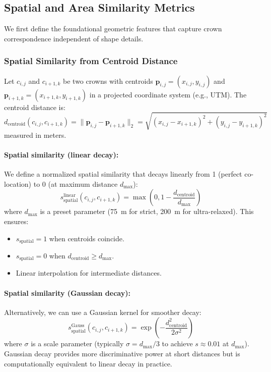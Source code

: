 \subsection{Spatial and Area Similarity Metrics}

We first define the foundational geometric features that capture crown correspondence independent of shape details.

\subsubsection{Spatial Similarity from Centroid Distance}

Let $c_{i,j}$ and $c_{i+1,k}$ be two crowns with centroids $\mathbf{p}_{i,j} = (x_{i,j}, y_{i,j})$ and $\mathbf{p}_{i+1,k} = (x_{i+1,k}, y_{i+1,k})$ in a projected coordinate system (e.g., UTM). The centroid distance is:
\[
d_{\text{centroid}}(c_{i,j}, c_{i+1,k}) = \|\mathbf{p}_{i,j} - \mathbf{p}_{i+1,k}\|_2 = \sqrt{(x_{i,j} - x_{i+1,k})^2 + (y_{i,j} - y_{i+1,k})^2}
\]
measured in meters.

\paragraph{Spatial similarity (linear decay):}
We define a normalized spatial similarity that decays linearly from 1 (perfect co-location) to 0 (at maximum distance $d_{\max}$):
\[
s_{\text{spatial}}^{\text{linear}}(c_{i,j}, c_{i+1,k}) = \max\left(0, 1 - \frac{d_{\text{centroid}}}{d_{\max}}\right)
\]
where $d_{\max}$ is a preset parameter (75~m for strict, 200~m for ultra-relaxed). This ensures:
\begin{itemize}
    \item $s_{\text{spatial}} = 1$ when centroids coincide.
    \item $s_{\text{spatial}} = 0$ when $d_{\text{centroid}} \geq d_{\max}$.
    \item Linear interpolation for intermediate distances.
\end{itemize}

\paragraph{Spatial similarity (Gaussian decay):}
Alternatively, we can use a Gaussian kernel for smoother decay:
\[
s_{\text{spatial}}^{\text{Gauss}}(c_{i,j}, c_{i+1,k}) = \exp\left(-\frac{d_{\text{centroid}}^2}{2\sigma^2}\right)
\]
where $\sigma$ is a scale parameter (typically $\sigma = d_{\max}/3$ to achieve $s \approx 0.01$ at $d_{\max}$). Gaussian decay provides more discriminative power at short distances but is computationally equivalent to linear decay in practice.

